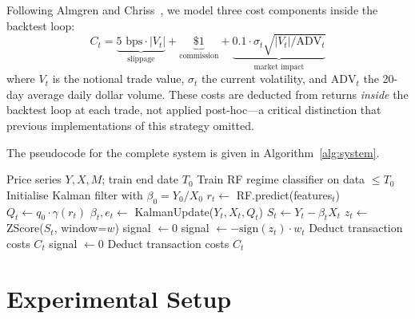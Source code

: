\documentclass{ieeeaccess}
\begin{document}
Following Almgren and Chriss~\cite{almgren2001optimal}, we model three cost components inside the backtest loop:
\begin{equation}
    C_t = \underbrace{5 \text{ bps} \cdot |V_t|}_{\text{slippage}} + \underbrace{\$1}_{\text{commission}} + \underbrace{0.1 \cdot \sigma_t \sqrt{|V_t| / \text{ADV}_t}}_{\text{market impact}}
    \label{eq:costs}
\end{equation}
where $V_t$ is the notional trade value, $\sigma_t$ the current volatility, and $\text{ADV}_t$ the 20-day average daily dollar volume.
These costs are deducted from returns \emph{inside} the backtest loop at each trade, not applied post-hoc---a critical distinction that previous implementations of this strategy omitted.

The pseudocode for the complete system is given in Algorithm~\ref{alg:system}.

\begin{algorithm}[t]
\caption{Regime-Adaptive Pairs Trading}
\label{alg:system}
\begin{algorithmic}[1]
\REQUIRE Price series $Y, X, M$; train end date $T_0$
\STATE Train RF regime classifier on data $\leq T_0$
\STATE Initialise Kalman filter with $\beta_0 = Y_0 / X_0$
    \STATE $r_t \leftarrow$ RF.predict(features$_t$) 
    \STATE $Q_t \leftarrow q_0 \cdot \gamma(r_t)$ 
    \STATE $\beta_t, e_t \leftarrow$ KalmanUpdate($Y_t, X_t, Q_t$) 
    \STATE $S_t \leftarrow Y_t - \beta_t X_t$ 
    \STATE $z_t \leftarrow$ ZScore($S_t$, window=$w$) 
        \STATE signal $\leftarrow 0$ 
        \STATE signal $\leftarrow -\text{sign}(z_t) \cdot w_t$
        \STATE Deduct transaction costs $C_t$
        \STATE signal $\leftarrow 0$ 
        \STATE Deduct transaction costs $C_t$
    \ENDIF
\ENDFOR
\end{algorithmic}
\end{algorithm}

\section{Experimental Setup}
\label{sec:experiments}
\end{document}
